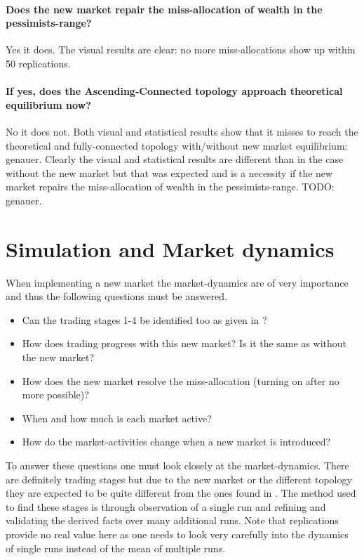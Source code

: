 \documentclass[Bachelorarbeit.tex]{subfiles}
\begin{document}
\paragraph{Does the new market repair the miss-allocation of wealth in the pessimists-range?}
Yes it does. The visual results are clear: no more miss-allocations show up within 50 replications.

\paragraph{If yes, does the Ascending-Connected topology approach theoretical equilibrium now?}
No it does not. Both visual and statistical results show that it misses to reach the theoretical and fully-connected topology with/without new market equilibrium: genauer.
Clearly the visual and statistical results are different than in the case without the new market but that was expected and is a necessity if the new market repairs the miss-allocation of wealth in the pessimists-range. TODO: genauer.

\section{Simulation and Market dynamics}
When implementing a new market the market-dynamics are of very importance and thus the following questions must be answered.

\begin{itemize}
\item Can the trading stages 1-4 be identified too as given in \cite{Breuer_2015}?
\item How does trading progress with this new market? Is it the same as without the new market?
\item How does the new market resolve the miss-allocation (turning on after no more possible)?
\item When and how much is each market active? 
\item How do the market-activities change when a new market is introduced?
\end{itemize}

To answer these questions one must look closely at the market-dynamics. There are definitely trading stages but due to the new market or the different topology they are expected to be quite different from the ones found in \cite{Breuer_2015}. The method used to find these stages is through observation of a single run and refining and validating the derived facts over many additional runs. Note that replications provide no real value here as one needs to look very carefully into the dynamics of single runs instead of the mean of multiple runs.
\end{document}

